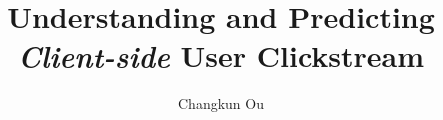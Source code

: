 \documentclass[11pt,a4paper,twoside]{article}
\title{Understanding and Predicting \emph{Client-side} User Clickstream}
\author{Changkun Ou}
\begin{document}
\makecover
\makeaufgabenstellung
\makededication
\makeabstract
\maketoc
\cleardoublepage












\end{document}
